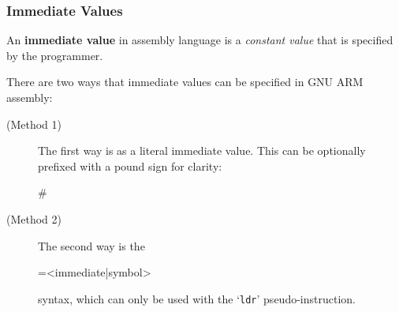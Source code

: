 \begin{table}[h!]\centering
\caption{AArch64 condition modifiers.}
\end{table}
\subsubsection{Immediate Values}

\begin{terminology*}
An \textbf{immediate value} in assembly language is a \textit{constant value} that is specified by the programmer.
\end{terminology*}

There are two ways that immediate values can be specified in GNU ARM assembly:
\begin{description}
	\item[(Method 1)] The first way is as a literal immediate value. This can be optionally prefixed with a pound sign for clarity: \begin{center}
		\ttfamily \#<immediate|symbol>
	\end{center}
	\item[(Method 2)] The second way is the \begin{center}
		\ttfamily =<immediate|symbol>
	\end{center} syntax, which can only be used with the `\texttt{ldr}' pseudo-instruction.
\end{description}
\begin{table}[h!]\centering
\caption{Summary of Valid Immediate Values}
\end{table}


